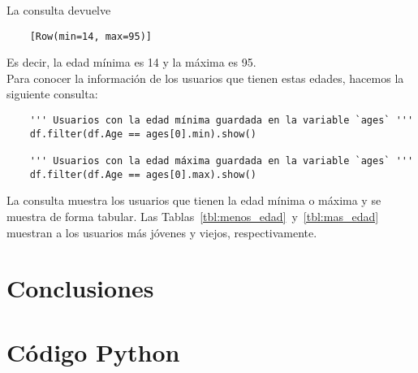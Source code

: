\documentclass[12pt,a4paper,twoside,openright,titlepage,final]{article}
\begin{document}
\begin{enumerate}
	La consulta devuelve 
	
	\begin{verbatim}
	[Row(min=14, max=95)]
	\end{verbatim}
	
	Es decir, la edad mínima es 14 y la máxima es 95.\\
	
	Para conocer la información de los usuarios que tienen estas edades, hacemos la siguiente consulta:
	
	\begin{verbatim}
	''' Usuarios con la edad mínima guardada en la variable `ages` '''
	df.filter(df.Age == ages[0].min).show()
	
	''' Usuarios con la edad máxima guardada en la variable `ages` '''
	df.filter(df.Age == ages[0].max).show()
	\end{verbatim}
	
	La consulta muestra los usuarios que tienen la edad mínima o máxima y se muestra de forma tabular. Las Tablas~\ref{tbl:menos_edad}~y~\ref{tbl:mas_edad} muestran a los usuarios más jóvenes y viejos, respectivamente.\\  
	
	\begin{table}[htbp!]
		\centering
		\caption{Usuarios más jovenes}
		\label{tbl:menos_edad}
	\end{table}
	
	
\end{enumerate}
\section{Conclusiones}

\newpage

\section{Código Python}

\begin{verbatim}

\end{verbatim}
\end{document}
